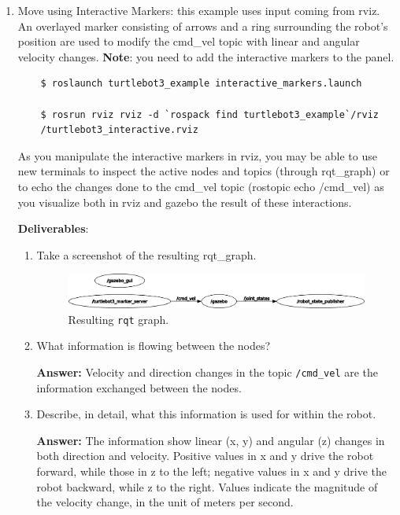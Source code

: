 \documentclass[12pt]{article}
\begin{document}
\begin{enumerate}
  \item Move using Interactive Markers: this example uses input coming from rviz. An overlayed marker consisting of arrows and a ring surrounding the robot’s position are used to modify the cmd\_vel topic with linear and angular velocity changes. \textbf{Note}: you need to add the interactive markers to the panel.

  \begin{verbatim}
    $ roslaunch turtlebot3_example interactive_markers.launch

    $ rosrun rviz rviz -d `rospack find turtlebot3_example`/rviz
    /turtlebot3_interactive.rviz
  \end{verbatim}

  As you manipulate the interactive markers in rviz, you may be able to use new terminals to inspect the active nodes and topics (through rqt\_graph) or to echo the changes done to the cmd\_vel topic (rostopic echo /cmd\_vel) as you visualize both in rviz and gazebo the result of these interactions.

  \textbf{Deliverables}: 

    \begin{enumerate}

      \item Take a screenshot of the resulting rqt\_graph.
    
      \begin{figure}[H]
        \centering\includegraphics[width=14cm]{images/rosgraph.png}\vspace{-10pt}
        \caption{Resulting \texttt{rqt} graph.}\label{fig:rosgraph}
        \end{figure}

      \item What information is flowing between the nodes?

      \textbf{Answer: }Velocity and direction changes in the topic \texttt{/cmd_vel} are the information exchanged between the nodes.

      \item Describe, in detail, what this information is used for within the robot.
    
      \textbf{Answer: }The information show linear (x, y) and angular (z) changes in both direction and velocity. 
      Positive values in x and y drive the robot forward, while those in z to the left; negative values in x and y drive the robot backward, while z to the right.
      Values indicate the magnitude of the velocity change, in the unit of meters per second.
    

\end{enumerate}
\end{enumerate}
\end{document}
